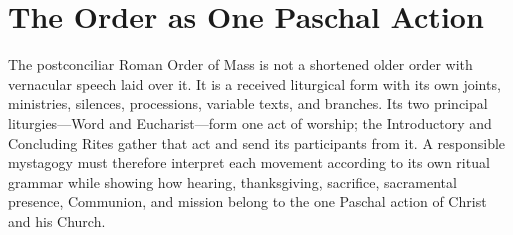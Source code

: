 \section{The Order as One Paschal Action}

The postconciliar Roman Order of Mass is not a shortened older order with vernacular speech laid over it. It is a received liturgical form with its own joints, ministries, silences, processions, variable texts, and branches. Its two principal liturgies---Word and Eucharist---form one act of worship; the Introductory and Concluding Rites gather that act and send its participants from it. A responsible mystagogy must therefore interpret each movement according to its own ritual grammar while showing how hearing, thanksgiving, sacrifice, sacramental presence, Communion, and mission belong to the one Paschal action of Christ and his Church.

